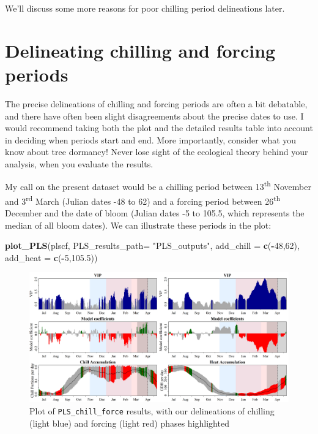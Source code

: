 \documentclass[
]{book}
\newenvironment{Shaded}{\begin{snugshade}}{\end{snugshade}}
\newcommand{\DataTypeTok}[1]{\textcolor[rgb]{0.13,0.29,0.53}{#1}}
\newcommand{\DecValTok}[1]{\textcolor[rgb]{0.00,0.00,0.81}{#1}}
\newcommand{\FloatTok}[1]{\textcolor[rgb]{0.00,0.00,0.81}{#1}}
\newcommand{\KeywordTok}[1]{\textcolor[rgb]{0.13,0.29,0.53}{\textbf{#1}}}
\newcommand{\NormalTok}[1]{#1}
\newcommand{\OperatorTok}[1]{\textcolor[rgb]{0.81,0.36,0.00}{\textbf{#1}}}
\newcommand{\StringTok}[1]{\textcolor[rgb]{0.31,0.60,0.02}{#1}}
\begin{document}
We'll discuss some more reasons for poor chilling period delineations later.

\hypertarget{delineating-chilling-and-forcing-periods}{%
\section{Delineating chilling and forcing periods}\label{delineating-chilling-and-forcing-periods}}

The precise delineations of chilling and forcing periods are often a bit debatable, and there have often been slight disagreements about the precise dates to use. I would recommend taking both the plot and the detailed results table into account in deciding when periods start and end. More importantly, consider what you know about tree dormancy! Never lose sight of the ecological theory behind your analysis, when you evaluate the results.

My call on the present dataset would be a chilling period between 13\textsuperscript{th} November and 3\textsuperscript{rd} March (Julian dates -48 to 62) and a forcing period between 26\textsuperscript{th} December and the date of bloom (Julian dates -5 to 105.5, which represents the median of all bloom dates). We can illustrate these periods in the plot:

\begin{Shaded}
\begin{Highlighting}[]
\KeywordTok{plot_PLS}\NormalTok{(plscf,}
         \DataTypeTok{PLS_results_path=} \StringTok{"PLS_outputs"}\NormalTok{,}
         \DataTypeTok{add_chill =} \KeywordTok{c}\NormalTok{(}\OperatorTok{-}\DecValTok{48}\NormalTok{,}\DecValTok{62}\NormalTok{),}
         \DataTypeTok{add_heat =} \KeywordTok{c}\NormalTok{(}\OperatorTok{-}\DecValTok{5}\NormalTok{,}\FloatTok{105.5}\NormalTok{))}
\end{Highlighting}
\end{Shaded}

\begin{figure}
\centering
\includegraphics{pictures/PLS_outputs_Chill_Portions_GDH_phases.png}
\caption{Plot of \texttt{PLS\_chill\_force} results, with our delineations of chilling (light blue) and forcing (light red) phases highlighted}
\end{figure}
\end{document}
